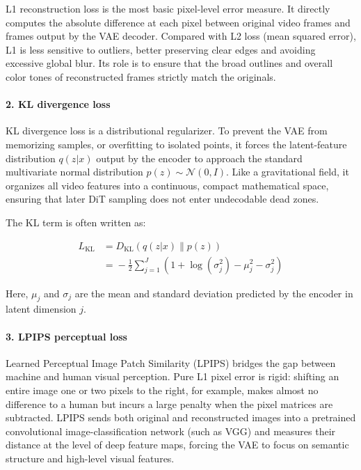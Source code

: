 L1 reconstruction loss is the most basic pixel-level error measure. It directly computes the absolute difference at each pixel between original video frames and frames output by the VAE decoder. Compared with L2 loss (mean squared error), L1 is less sensitive to outliers, better preserving clear edges and avoiding excessive global blur. Its role is to ensure that the broad outlines and overall color tones of reconstructed frames strictly match the originals.

\hypertarget{kl-divergence-loss}{%
\paragraph{2. KL divergence loss}\label{kl-divergence-loss}}

KL divergence loss is a distributional regularizer. To prevent the VAE from memorizing samples, or overfitting to isolated points, it forces the latent-feature distribution \(q(z|x)\) output by the encoder to approach the standard multivariate normal distribution \(p(z)\sim\mathcal{N}(0,I)\). Like a gravitational field, it organizes all video features into a continuous, compact mathematical space, ensuring that later DiT sampling does not enter undecodable dead zones.

The KL term is often written as:

\[
\begin{aligned}
L_{\mathrm{KL}}
&=
D_{\mathrm{KL}}(q(z|x)\|p(z))
\\
&=
{}-\frac{1}{2}\sum_{j=1}^{J}
\left(1+\log(\sigma_j^2)-\mu_j^2-\sigma_j^2\right)
\end{aligned}
\]

Here, \(\mu_j\) and \(\sigma_j\) are the mean and standard deviation predicted by the encoder in latent dimension \(j\).

\hypertarget{lpips-perceptual-loss}{%
\paragraph{3. LPIPS perceptual loss}\label{lpips-perceptual-loss}}

Learned Perceptual Image Patch Similarity (LPIPS) bridges the gap between machine and human visual perception. Pure L1 pixel error is rigid: shifting an entire image one or two pixels to the right, for example, makes almost no difference to a human but incurs a large penalty when the pixel matrices are subtracted. LPIPS sends both original and reconstructed images into a pretrained convolutional image-classification network (such as VGG) and measures their distance at the level of deep feature maps, forcing the VAE to focus on semantic structure and high-level visual features.

